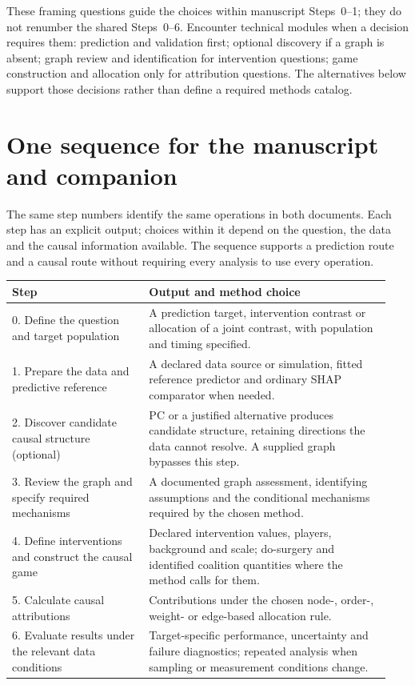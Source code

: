 \documentclass[11pt,letterpaper]{article}
\begin{document}
These framing questions guide the choices within manuscript Steps~0--1; they do not renumber the shared Steps~0--6. Encounter technical modules when a decision requires them: prediction and validation first; optional discovery if a graph is absent; graph review and identification for intervention questions; game construction and allocation only for attribution questions. The alternatives below support those decisions rather than define a required methods catalog.

\section*{One sequence for the manuscript and companion}

The same step numbers identify the same operations in both documents. Each step has an explicit output; choices within it depend on the question, the data and the causal information available. The sequence supports a prediction route and a causal route without requiring every analysis to use every operation.

\begingroup\small\setlength{\tabcolsep}{5pt}
\begin{longtable}{@{}L{0.34\linewidth}L{0.60\linewidth}@{}}
\toprule Step & Output and method choice\\\midrule{}. Define the question and target population & A prediction target, intervention contrast or allocation of a joint contrast, with population and timing specified.\\[6pt]
1. Prepare the data and predictive reference & A declared data source or simulation, fitted reference predictor and ordinary SHAP comparator when needed.\\[6pt]
2. Discover candidate causal structure (optional) & PC or a justified alternative produces candidate structure, retaining directions the data cannot resolve. A supplied graph bypasses this step.\\[6pt]
3. Review the graph and specify required mechanisms & A documented graph assessment, identifying assumptions and the conditional mechanisms required by the chosen method.\\[6pt]
4. Define interventions and construct the causal game & Declared intervention values, players, background and scale; do-surgery and identified coalition quantities where the method calls for them.\\[6pt]
5. Calculate causal attributions & Contributions under the chosen node-, order-, weight- or edge-based allocation rule.\\[6pt]
6. Evaluate results under the relevant data conditions & Target-specific performance, uncertainty and failure diagnostics; repeated analysis when sampling or measurement conditions change.\\
\bottomrule
\end{longtable}\endgroup
\end{document}
